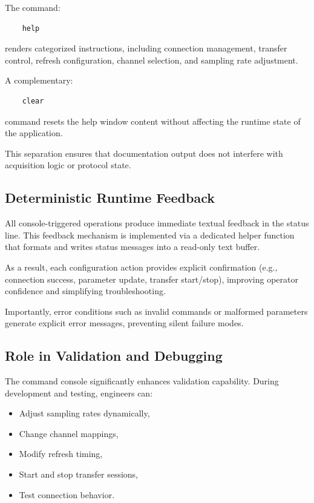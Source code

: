 The command:

\begin{verbatim}
	help
\end{verbatim}

renders categorized instructions, including connection management, transfer control, refresh configuration, channel selection, and sampling rate adjustment.

A complementary:

\begin{verbatim}
	clear
\end{verbatim}

command resets the help window content without affecting the runtime state of the application.

This separation ensures that documentation output does not interfere with acquisition logic or protocol state.

\subsection{Deterministic Runtime Feedback}
\label{sec:gui_runtime_feedback}

All console-triggered operations produce immediate textual feedback in the status line. This feedback mechanism is implemented via a dedicated helper function that formats and writes status messages into a read-only text buffer.

As a result, each configuration action provides explicit confirmation (e.g., connection success, parameter update, transfer start/stop), improving operator confidence and simplifying troubleshooting.

Importantly, error conditions such as invalid commands or malformed parameters generate explicit error messages, preventing silent failure modes.

\subsection{Role in Validation and Debugging}
\label{sec:gui_console_validation}

The command console significantly enhances validation capability. During development and testing, engineers can:

\begin{itemize}
	\item Adjust sampling rates dynamically,
	\item Change channel mappings,
	\item Modify refresh timing,
	\item Start and stop transfer sessions,
	\item Test connection behavior.
\end{itemize}

